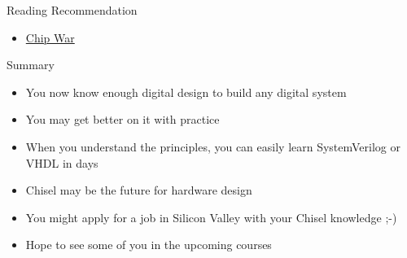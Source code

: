 \begin{frame}[fragile]{Reading Recommendation}
\begin{itemize}
\item \href{https://www.amazon.com/Chip-War-Worlds-Critical-Technology/dp/1982172002}{Chip War}
\end{itemize}
\end{frame}

\begin{frame}[fragile]{Summary}
\begin{itemize}
\item You now know enough digital design to build any digital system
\item You may get better on it with practice
\item When you understand the principles, you can easily learn SystemVerilog or VHDL in days
\item Chisel may be the future for hardware design
\item You might apply for a job in Silicon Valley with your Chisel knowledge ;-)
\item Hope to see some of you in the upcoming courses
\end{itemize}
\end{frame}






